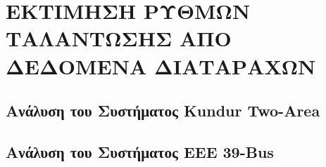 \chapter{ΕΚΤΙΜΗΣΗ ΡΥΘΜΩΝ ΤΑΛΑΝΤΩΣΗΣ ΑΠΟ ΔΕΔΟΜΕΝΑ ΔΙΑΤΑΡΑΧΩΝ}
\label{chap:ringdown-analysis}

\begingroup
\newcommand{\preliminaryfigurepath}{PreliminaryInvestigation/}
\newcommand{\ieeeThirtyNinePathanalysis}{IEEE39/analysis/}
\newif\ifkundursystemanalysis


\kundursystemanalysistrue
\section{Ανάλυση του Συστήματος \textenglish{Kundur Two-Area}}




\kundursystemanalysisfalse
\section{Ανάλυση του Συστήματος \textenglish{EEE 39-Bus}}





\endgroup
